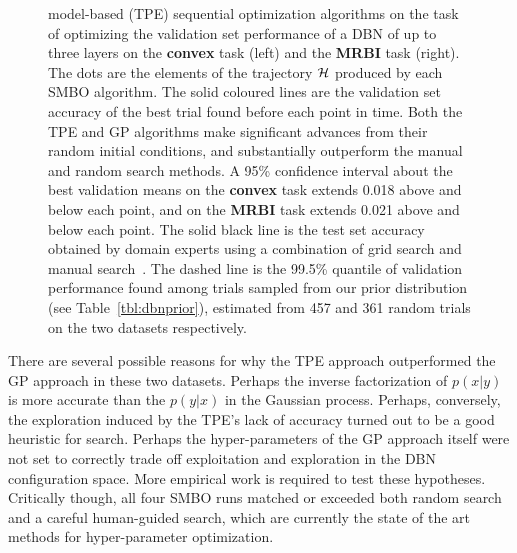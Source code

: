 \documentclass{article}
\newcommand{\vs}[1]{\vspace*{-#1mm}}
\begin{document}
\begin{figure}
\begin{minipage}{0.9\linewidth}
{    model-based (TPE) sequential optimization algorithms on the task of optimizing the validation set performance of a DBN of up to three layers on the {\bf convex} task (left) and the {\bf MRBI} task (right).
    The dots are the elements of the trajectory ${\cal H}$ produced by each SMBO algorithm.
    The solid coloured lines are the validation set accuracy of the best trial found before each point in time.
    Both the TPE and GP algorithms make significant advances from their random
    initial conditions, and substantially outperform the manual and random
    search methods. A 95\% confidence interval
    about the best validation means on the {\bf convex} task extends 0.018 above and below each point,
    and on the {\bf MRBI} task extends 0.021 above and below each point.
    The solid black line is the test set accuracy obtained by domain experts using a combination
    of grid search and manual search~\citep{Larochelle+etal:2007}.
    The dashed line is the 99.5\% quantile of validation performance found among trials sampled from our prior distribution (see Table~\ref{tbl:dbnprior}),
    estimated from 457 and 361 random trials on the two datasets respectively.
    }
  \vs{4}
    \label{fig:H}
\end{minipage}
\end{figure}







There are several possible reasons for why the TPE approach outperformed the GP approach in
these two datasets.
Perhaps the inverse factorization of $p(x|y)$ is more accurate than
the $p(y|x)$ in the Gaussian process.
Perhaps, conversely, the exploration induced by the TPE's lack of accuracy
turned out to be a good heuristic for search.
Perhaps the hyper-parameters of the GP approach itself were not set
to correctly trade off exploitation and exploration in the DBN configuration
space.
More empirical work is required to test these hypotheses.
Critically though, all four SMBO runs matched or exceeded both random search
and a careful human-guided search,
which are currently the state of the art methods for hyper-parameter optimization.
\end{document}
